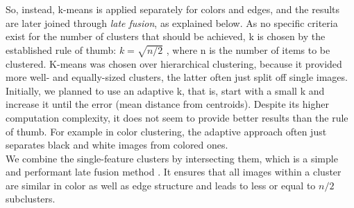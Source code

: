 \bigskip
So, instead, k-means is applied separately for colors and edges, and the results are later joined through \emph{late fusion}, as explained below. As no specific criteria exist for the number of clusters that should be achieved, k is chosen by the established rule of thumb: $ k = \sqrt{n/2} $ \cite[p.365]{mardia1979}, where n is the number of items to be clustered. K-means was chosen over hierarchical clustering, because it provided more well- and equally-sized clusters, the latter often just split off single images.\\
Initially, we planned to use an adaptive k, that is, start with a small k and increase it until the error (mean distance from centroids). Despite its higher computation complexity, it does not seem to provide better results than the rule of thumb. For example in color clustering, the adaptive approach often just separates black and white images from colored ones.\\
We combine the single-feature clusters by intersecting them, which is a simple and performant late fusion method . It ensures that all images within a cluster are similar in color as well as edge structure and leads to less or equal to $ n/2 $ subclusters.
